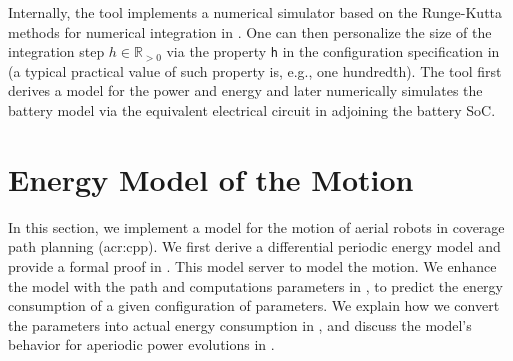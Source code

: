 Internally, the tool implements a numerical simulator based on the Runge-Kutta methods for numerical integration in . One can then personalize the size of the integration step $h\in\mathbb{R}_{>0}$ via the property {\small\tt h} in the configuration specification in  (a typical practical value of such property is, e.g., one hundredth). The tool first derives a model for the power and energy and later numerically simulates the battery model via the equivalent electrical circuit in  adjoining the battery SoC.


\section{Energy Model of the Motion}
\label{sec:mot-ener-model}

In this section, we implement a model for the motion of aerial robots in coverage path planning (\Gls{acr:cpp}). We first derive a differential periodic energy model and provide a formal proof in . This model server to model the motion. We enhance the model with the path and computations parameters in , to predict the energy consumption of a given configuration of parameters. We explain how we convert the parameters into actual energy consumption in , and discuss the model's behavior for aperiodic power evolutions in .

